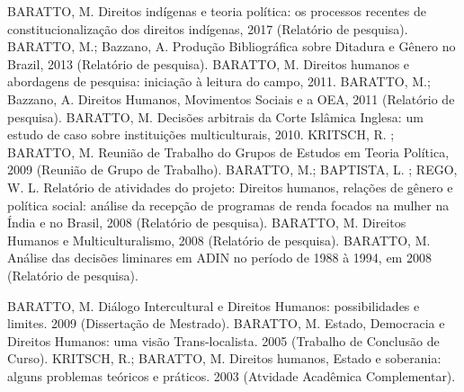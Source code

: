 
\begin{cvcitems}
  \cvcitem
    {BARATTO, M.}
    {Direitos indígenas e teoria política: os processos recentes de constitucionalização dos direitos indígenas, 2017 (Relatório de pesquisa).}
  \cvcitem
    {BARATTO, M.; Bazzano, A.}
    {Produção Bibliográfica sobre Ditadura e Gênero no Brazil, 2013 (Relatório de pesquisa).}
  \cvcitem
    {BARATTO, M.}
    {Direitos humanos e abordagens de pesquisa: iniciação à leitura do campo, 2011.}
  \cvcitem
    {BARATTO, M.; Bazzano, A.}
    {Direitos Humanos, Movimentos Sociais e a OEA, 2011 (Relatório de pesquisa).}
  \cvcitem
    {BARATTO, M.}
    {Decisões arbitrais da Corte Islâmica Inglesa: um estudo de caso sobre instituições multiculturais, 2010.}
  \cvcitem
    {KRITSCH, R. ; BARATTO, M.}
    {Reunião de Trabalho do Grupos de Estudos em Teoria Política, 2009 (Reunião de Grupo de Trabalho).}
  \cvcitem
    {BARATTO, M.; BAPTISTA, L. ; REGO, W. L.}
    {Relatório de atividades do projeto: Direitos humanos, relações de gênero e política social: análise da recepção de programas de renda focados na mulher na Índia e no Brasil, 2008 (Relatório de pesquisa).}
  \cvcitem
    {BARATTO, M.}
    {Direitos Humanos e Multiculturalismo, 2008 (Relatório de pesquisa).}
  \cvcitem
    {BARATTO, M.}
    {Análise das decisões liminares em ADIN no período de 1988 à 1994, em 2008 (Relatório de pesquisa).}
\end{cvcitems}


\begin{cvcitems}
  \cvcitem
    {BARATTO, M.}
    {Diálogo Intercultural e Direitos Humanos: possibilidades e limites. 2009 (Dissertação de Mestrado).}
  \cvcitem
    {BARATTO, M.}
    {Estado, Democracia e Direitos Humanos: uma visão Trans-localista. 2005 (Trabalho de Conclusão de Curso).}
  \cvcitem
    {KRITSCH, R.; BARATTO, M.}
    {Direitos humanos, Estado e soberania: alguns problemas teóricos e práticos. 2003
    (Atvidade Acadêmica Complementar).}
\end{cvcitems}
\pagebreak
